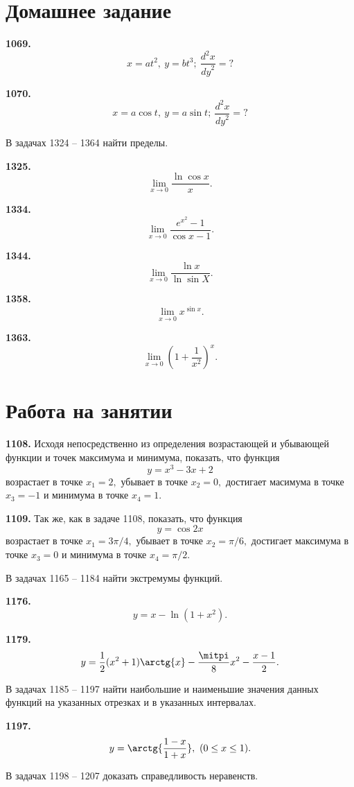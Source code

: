 \documentclass[a4paper,10pt]{article}
\newcommand{\exercize}[1]{\textbf{#1.}}
\begin{document}
\section{Домашнее задание}

\exercize{1069} \[ x = a t^2,\ y = b t^3;\ \frac{d^2 x}{{dy}^2} = ? \]

\exercize{1070} \[ x = a \cos{t},\ y = a \sin{t};\ \frac{d^2 x}{{dy}^2} = ? \]

В задачах 1324 -- 1364 найти пределы.

\exercize{1325} \[ \lim_{x \rightarrow 0} {\frac{\ln{\cos{x}}}{x}}. \]

\exercize{1334} \[ \lim_{x \rightarrow 0} {\frac{e^{x^2} - 1}{\cos{x} - 1}}. \]

\exercize{1344} \[ \lim_{x \rightarrow 0} {\frac{\ln{x}}{\ln{\sin{X}}}}. \]

\exercize{1358} \[ \lim_{x \rightarrow 0} {x^{\sin{x}}}. \]

\exercize{1363} \[ \lim_{x \rightarrow 0} {\left( 1 + \frac{1}{x^2} \right)^x}. \]


\section{Работа на занятии}

\exercize{1108} Исходя непосредственно из определения возрастающей и убывающей функции и точек максимума и минимума, показать, что функция 
\[ y = x^3 - 3 x + 2 \]
возрастает в точке $x_1 = 2,$ убывает в точке $x_2 = 0,$ достигает масимума в точке $x_3 = -1$ и минимума в точке $x_4 = 1$.

\exercize{1109} Так же, как в задаче 1108, показать, что функция 
\[ y = \cos{2 x} \]
возрастает в точке $x_1 = 3 \pi / 4,$ убывает в точке $x_2 = \pi / 6,$ достигает максимума в точке $x_3 = 0$ и минимума в точке $x_4 = \pi / 2.$

В задачах 1165 -- 1184 найти экстремумы функций.

\exercize{1176} \[ y = x - \ln{(1 + x^2)}. \]

\exercize{1179} \[ y = \frac{1}{2}(x^2 + 1) \arctg{x} - \frac{\pi}{8}x^2 - \frac{x - 1}{2}. \]


В задачах 1185 -- 1197 найти наибольшие и наименьшие значения данных функций на указанных отрезках и в указанных интервалах.

\exercize{1197} \[ y = \arctg{\frac{1 - x}{1 + x}},\ (0 \le x \le 1). \]

В задачах 1198 -- 1207 доказать справедливость неравенств.
\end{document}
